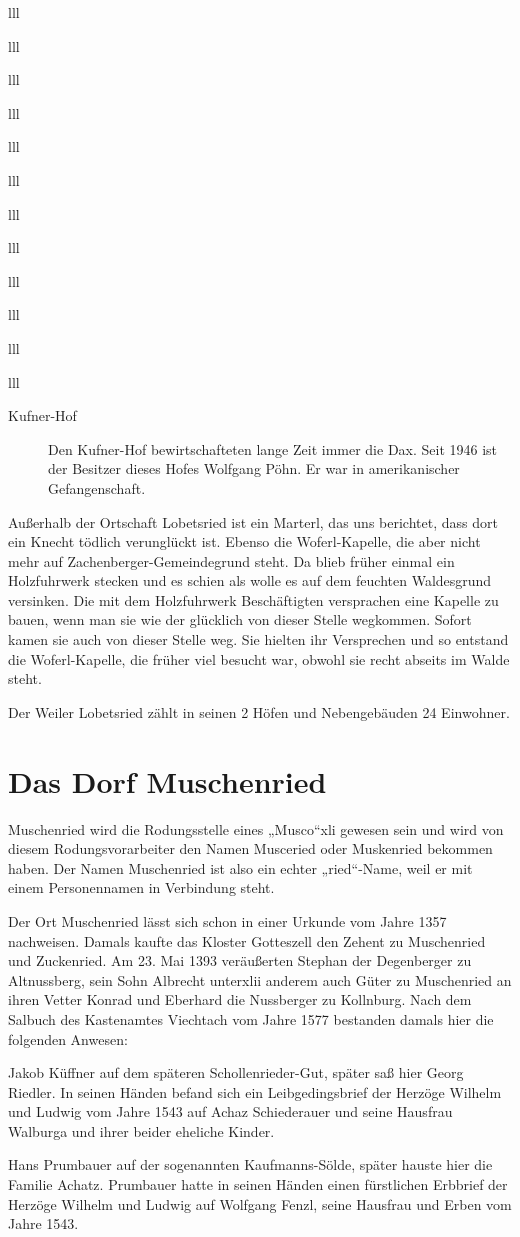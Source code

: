 \documentclass[12pt,a4pager]{book}
\begin{document}
\begin{tabuluar}{lll}
\begin{tabuluar}{lll}
\begin{tabuluar}{lll}
\begin{tabuluar}{lll}
\begin{tabuluar}{lll}
\begin{tabuluar}{lll}
\begin{tabuluar}{lll}
\begin{tabuluar}{lll}
\begin{tabuluar}{lll}
\begin{tabuluar}{lll}
\begin{tabuluar}{lll}
\begin{tabuluar}{lll}
\begin{description}
\item[Kufner-Hof] Den Kufner-Hof bewirtschafteten lange Zeit immer die Dax.
Seit 1946 ist der Besitzer dieses Hofes Wolfgang Pöhn. Er war in amerikanischer
Gefangenschaft.
\end{description}

Außerhalb der Ortschaft Lobetsried ist ein Marterl, das uns berichtet, dass dort
ein Knecht tödlich verunglückt ist. Ebenso die Woferl-Kapelle, die aber nicht
mehr auf Zachenberger-Gemeindegrund steht. Da blieb früher einmal ein
Holzfuhrwerk stecken und es schien als wolle es auf dem feuchten Waldesgrund
versinken. Die mit dem Holzfuhrwerk Beschäftigten versprachen eine Kapelle zu
bauen, wenn man sie wie der glücklich von dieser Stelle wegkommen. Sofort kamen
sie auch von dieser Stelle weg. Sie hielten ihr Versprechen und so entstand die
Woferl-Kapelle, die früher viel besucht war, obwohl sie recht abseits im Walde
steht.

Der Weiler Lobetsried zählt in seinen 2 Höfen und Nebengebäuden 24 Einwohner.

\section{Das Dorf Muschenried}

Muschenried wird die Rodungsstelle eines „Musco“xli gewesen sein und wird von
diesem Rodungsvorarbeiter den Namen Musceried oder Muskenried bekommen haben.
Der Namen Muschenried ist also ein echter „ried“-Name, weil er mit einem
Personennamen in Verbindung steht.

Der Ort Muschenried lässt sich schon in einer Urkunde vom Jahre 1357 nachweisen.
Damals kaufte das Kloster Gotteszell den Zehent zu Muschenried und Zuckenried.
Am 23. Mai 1393 veräußerten Stephan der Degenberger zu Altnussberg, sein Sohn
Albrecht unterxlii anderem auch Güter zu Muschenried an ihren Vetter Konrad und
Eberhard die Nussberger zu Kollnburg. Nach dem Salbuch des Kastenamtes Viechtach
vom Jahre 1577 bestanden damals hier die folgenden Anwesen:

Jakob Küffner auf dem späteren Schollenrieder-Gut, später saß hier Georg
Riedler. In seinen Händen befand sich ein Leibgedingsbrief der Herzöge Wilhelm
und Ludwig vom Jahre 1543 auf Achaz Schiederauer und seine Hausfrau Walburga und
ihrer beider eheliche Kinder.

Hans Prumbauer auf der sogenannten Kaufmanns-Sölde, später hauste hier die
Familie Achatz. Prumbauer hatte in seinen Händen einen fürstlichen Erbbrief der
Herzöge Wilhelm und Ludwig auf Wolfgang Fenzl, seine Hausfrau und Erben vom
Jahre 1543.


\end{tabuluar}
\end{tabuluar}
\end{tabuluar}
\end{tabuluar}
\end{tabuluar}
\end{tabuluar}
\end{tabuluar}
\end{tabuluar}
\end{tabuluar}
\end{tabuluar}
\end{tabuluar}
\end{tabuluar}
\end{document}
